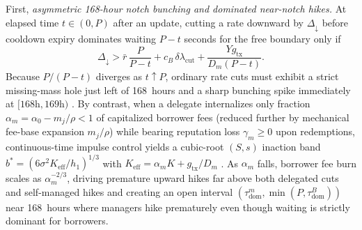 First, \emph{asymmetric 168-hour notch bunching and dominated near-notch hikes.} At elapsed time $t \in (0, P)$ after an update, cutting a rate downward by $\Delta_\downarrow$ before cooldown expiry dominates waiting $P - t$ seconds for the free boundary only if
\begin{equation}\label{eq:cut_thresh}
\Delta_\downarrow > \bar{r}\,\frac{P}{P - t} + c_B\,\delta\lambda_{\text{cut}} + \frac{Y g_{\text{tx}}}{D_m(P - t)}.
\end{equation}
Because $P/(P - t)$ diverges as $t \uparrow P$, ordinary rate cuts must exhibit a strict missing-mass hole just left of 168~hours and a sharp bunching spike immediately at $[168\text{h}, 169\text{h})$ \citep{kleven2013using}. By contrast, when a delegate internalizes only fraction $\alpha_m = \alpha_0 - m_j/\rho < 1$ of capitalized borrower fees (reduced further by mechanical fee-base expansion $m_j/\rho$) while bearing reputation loss $\gamma_m \ge 0$ upon redemptions, continuous-time impulse control yields a cubic-root $(S,s)$ inaction band $b^* = (6\sigma^2 K_{\text{eff}}/h_1)^{1/3}$ with $K_{\text{eff}} = \alpha_m K + g_{\text{tx}}/D_m$ \citep{harrison1983impulse}. As $\alpha_m$ falls, borrower fee burn scales as $\alpha_m^{-2/3}$, driving premature upward hikes far above both delegated cuts and self-managed hikes and creating an open interval $(\tau_{\text{dom}}^m, \min(P, \tau_{\text{dom}}^B))$ near 168~hours where managers hike prematurely even though waiting is strictly dominant for borrowers.

